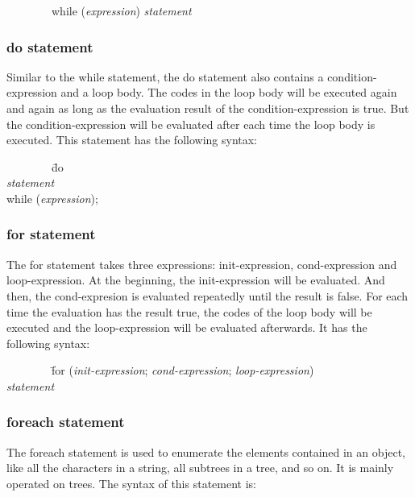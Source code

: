 \documentclass[12pt,psfig,a4]{article}
\begin{document}
\begin{code}
\begin{tabbing}
~~~~~~~~while (\textsl{expression}) \textsl{statement}
\end{tabbing}
\end{code}

\subsubsection{do statement}
Similar to the while statement, the do statement also contains a condition-expression and a loop body. The codes in the loop body will be executed again and again as long as the evaluation result of the condition-expression is true. But the condition-expression will be evaluated after each time the loop body is executed. This statement has the following syntax:

\begin{code}
\begin{tabbing}
~~~~~~~~\= do \= \\
\> \> \textsl{statement} \\
\> while (\textsl{expression});
\end{tabbing}
\end{code}

\subsubsection{for statement}
The for statement takes three expressions: init-expression, cond-expression and loop-expression. At the beginning, the init-expression will be evaluated. And then, the cond-expresion is evaluated repeatedly until the result is false. For each time the evaluation has the result true, the codes of the loop body will be executed and the loop-expression will be evaluated afterwards. It has the following syntax:

\begin{code}
\begin{tabbing}
~~~~~~~~\= for (\= \textsl{init-expression}; \textsl{cond-expression}; \textsl{loop-expression}) \\
\> \> \textsl{statement}
\end{tabbing}
\end{code}

\subsubsection{foreach statement}
The foreach statement is used to enumerate the elements contained in an object, like all the characters in a string, all subtrees in a tree, and so on. It is mainly operated on trees. The syntax of this statement is:
\end{document}

